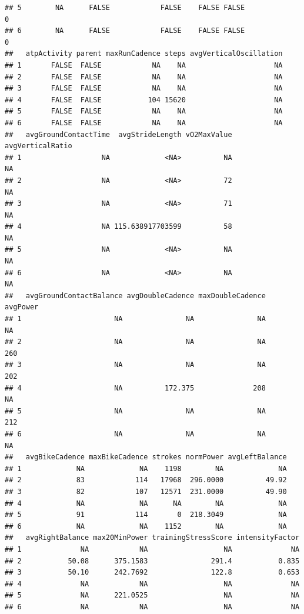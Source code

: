 \documentclass[
]{book}
\begin{document}
\begin{verbatim}
## 5        NA      FALSE            FALSE    FALSE FALSE                  0
## 6        NA      FALSE            FALSE    FALSE FALSE                  0
##   atpActivity parent maxRunCadence steps avgVerticalOscillation
## 1       FALSE  FALSE            NA    NA                     NA
## 2       FALSE  FALSE            NA    NA                     NA
## 3       FALSE  FALSE            NA    NA                     NA
## 4       FALSE  FALSE           104 15620                     NA
## 5       FALSE  FALSE            NA    NA                     NA
## 6       FALSE  FALSE            NA    NA                     NA
##   avgGroundContactTime  avgStrideLength vO2MaxValue avgVerticalRatio
## 1                   NA             <NA>          NA               NA
## 2                   NA             <NA>          72               NA
## 3                   NA             <NA>          71               NA
## 4                   NA 115.638917703599          58               NA
## 5                   NA             <NA>          NA               NA
## 6                   NA             <NA>          NA               NA
##   avgGroundContactBalance avgDoubleCadence maxDoubleCadence avgPower
## 1                      NA               NA               NA       NA
## 2                      NA               NA               NA      260
## 3                      NA               NA               NA      202
## 4                      NA          172.375              208       NA
## 5                      NA               NA               NA      212
## 6                      NA               NA               NA       NA
##   avgBikeCadence maxBikeCadence strokes normPower avgLeftBalance
## 1             NA             NA    1198        NA             NA
## 2             83            114   17968  296.0000          49.92
## 3             82            107   12571  231.0000          49.90
## 4             NA             NA      NA        NA             NA
## 5             91            114       0  218.3049             NA
## 6             NA             NA    1152        NA             NA
##   avgRightBalance max20MinPower trainingStressScore intensityFactor
## 1              NA            NA                  NA              NA
## 2           50.08      375.1583               291.4           0.835
## 3           50.10      242.7692               122.8           0.653
## 4              NA            NA                  NA              NA
## 5              NA      221.0525                  NA              NA
## 6              NA            NA                  NA              NA

\end{verbatim}
\end{document}
